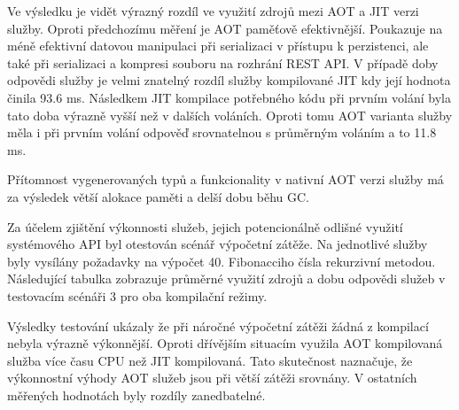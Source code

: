 Ve výsledku je vidět výrazný rozdíl ve využití zdrojů mezi AOT a JIT verzi služby. Oproti předchozímu měření je AOT paměťově efektivnější. Poukazuje na méně efektivní datovou manipulaci při serializaci v přístupu k perzistenci, ale také při serializaci a kompresi souboru na rozhrání REST API. V případě doby odpovědi služby je velmi znatelný rozdíl služby kompilované JIT kdy její hodnota činila 93.6 ms. Následkem JIT kompilace potřebného kódu při prvním volání byla tato doba výrazně vyšší než v dalších voláních. Oproti tomu AOT varianta služby měla i při prvním volání odpověď srovnatelnou s průměrným voláním a to 11.8 ms.


Přítomnost vygenerovaných typů a funkcionality v nativní AOT verzi služby má za výsledek větší alokace paměti a delší dobu běhu GC.


Za účelem zjištění výkonnosti služeb, jejich potencionálně odlišné využití systémového API byl otestován scénář výpočetní zátěže. Na jednotlivé služby byly vysílány požadavky na výpočet 40. Fibonacciho čísla rekurzivní metodou. Následující tabulka zobrazuje průměrné využití zdrojů a dobu odpovědi služeb v testovacím scénáři 3 pro oba kompilační režimy.


Výsledky testování ukázaly že při náročné výpočetní zátěži žádná z kompilací nebyla výrazně výkonnější. Oproti dřívějším situacím využila AOT kompilovaná služba více času CPU než JIT kompilovaná. Tato skutečnost naznačuje, že výkonnostní výhody AOT služeb jsou při větší zátěži srovnány. V ostatních měřených hodnotách byly rozdíly zanedbatelné. 

